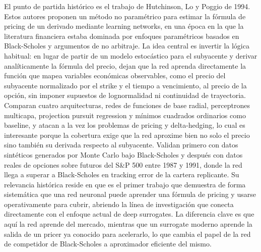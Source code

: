\documentclass[11pt,a4paper]{article}
\begin{document}
El punto de partida histórico es el trabajo de Hutchinson, Lo y Poggio de 1994. Estos autores proponen un método no paramétrico para estimar la fórmula de pricing de un derivado mediante learning networks, en una época en la que la literatura financiera estaba dominada por enfoques paramétricos basados en Black-Scholes y argumentos de no arbitraje. La idea central es invertir la lógica habitual: en lugar de partir de un modelo estocástico para el subyacente y derivar analíticamente la fórmula del precio, dejan que la red aprenda directamente la función que mapea variables económicas observables, como el precio del subyacente normalizado por el strike y el tiempo a vencimiento, al precio de la opción, sin imponer supuestos de lognormalidad ni continuidad de trayectoria. Comparan cuatro arquitecturas, redes de funciones de base radial, perceptrones multicapa, projection pursuit regression y mínimos cuadrados ordinarios como baseline, y atacan a la vez los problemas de pricing y delta-hedging, lo cual es interesante porque la cobertura exige que la red aproxime bien no solo el precio sino también su derivada respecto al subyacente. Validan primero con datos sintéticos generados por Monte Carlo bajo Black-Scholes y después con datos reales de opciones sobre futuros del S\&P 500 entre 1987 y 1991, donde la red llega a superar a Black-Scholes en tracking error de la cartera replicante. Su relevancia histórica reside en que es el primer trabajo que demuestra de forma sistemática que una red neuronal puede aprender una fórmula de pricing y usarse operativamente para cubrir, abriendo la línea de investigación que conecta directamente con el enfoque actual de deep surrogates. La diferencia clave es que aquí la red aprende del mercado, mientras que un surrogate moderno aprende la salida de un pricer ya conocido para acelerarlo, lo que cambia el papel de la red de competidor de Black-Scholes a aproximador eficiente del mismo.
\end{document}
